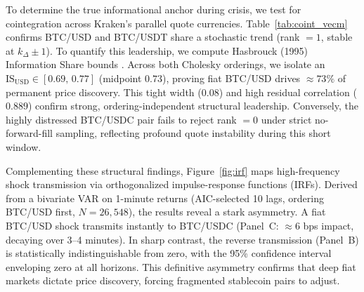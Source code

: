 \documentclass[12pt,twocolumn]{article}
\begin{document}
\begin{table}[H]
\label{tab:coint_vecm}
\footnotesize
\centering
{}
\caption{Johansen cointegration and VECM price-discovery results for primary Kraken channels (no-FF sample).}
\end{table}

To determine the true informational anchor during crisis, we test for cointegration across Kraken's parallel quote currencies. Table~\ref{tab:coint_vecm} confirms BTC/USD and BTC/USDT share a stochastic trend (rank $=1$, stable at $k_\Delta\pm1$). To quantify this leadership, we compute Hasbrouck (1995) Information Share bounds \cite{hasbrouck1995}. Across both Cholesky orderings, we isolate an $\text{IS}_{\text{USD}}\in[0.69,\,0.77]$ (midpoint $\mathbf{0.73}$), proving fiat BTC/USD drives ${\approx}73\%$ of permanent price discovery. This tight width ($0.08$) and high residual correlation ($0.889$) confirm strong, ordering-independent structural leadership. Conversely, the highly distressed BTC/USDC pair fails to reject rank $=0$ under strict no-forward-fill sampling, reflecting profound quote instability during this short window.

Complementing these structural findings, Figure~\ref{fig:irf} maps high-frequency shock transmission via orthogonalized impulse-response functions (IRFs). Derived from a bivariate VAR on 1-minute returns (AIC-selected 10 lags, ordering BTC/USD first, $N{=}26{,}548$), the results reveal a stark asymmetry. A fiat BTC/USD shock transmits instantly to BTC/USDC (Panel~C: ${\approx}6$ bps impact, decaying over 3--4 minutes). In sharp contrast, the reverse transmission (Panel~B) is statistically indistinguishable from zero, with the 95\% confidence interval enveloping zero at all horizons. This definitive asymmetry confirms that deep fiat markets dictate price discovery, forcing fragmented stablecoin pairs to adjust.
\end{document}

